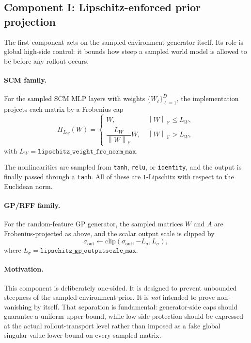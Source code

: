 \documentclass[11pt]{article}
\newcommand{\1}{\mathbf{1}}
\newcommand{\frobnorm}[1]{\left\lVert #1 \right\rVert_{\mathrm{F}}}
\begin{document}
\subsection{Component I: Lipschitz-enforced prior projection}
The first component acts on the sampled environment generator itself. Its role is global high-side control: it bounds how steep a sampled world model is allowed to be before any rollout occurs.

\paragraph{SCM family.}
For the sampled SCM MLP layers with weights $\{W_\ell\}_{\ell=1}^{D}$, the implementation projects each matrix by a Frobenius cap
\begin{equation}
  \Pi_{L_W}(W) =
  \begin{cases}
    W, & \frobnorm{W} \le L_W, \\
    \dfrac{L_W}{\frobnorm{W}} W, & \frobnorm{W} > L_W,
  \end{cases}
\end{equation}
with $L_W = \texttt{lipschitz\_weight\_fro\_norm\_max}$.

The nonlinearities are sampled from \texttt{tanh}, \texttt{relu}, or \texttt{identity}, and the output is finally passed through a \texttt{tanh}. All of these are $1$-Lipschitz with respect to the Euclidean norm.

\paragraph{GP/RFF family.}
For the random-feature GP generator, the sampled matrices $W$ and $A$ are Frobenius-projected as above, and the scalar output scale is clipped by
\begin{equation}
  \sigma_{\mathrm{out}} \leftarrow \mathrm{clip}\!\left(\sigma_{\mathrm{out}}, -L_{\sigma}, L_{\sigma}\right),
\end{equation}
where $L_{\sigma} = \texttt{lipschitz\_gp\_outputscale\_max}$.

\paragraph{Motivation.}
This component is deliberately one-sided. It is designed to prevent unbounded steepness of the sampled environment prior. It is \emph{not} intended to prove non-vanishing by itself. That separation is fundamental: generator-side caps should guarantee a uniform upper bound, while low-side protection should be expressed at the actual rollout-transport level rather than imposed as a fake global singular-value lower bound on every sampled matrix.
\end{document}
